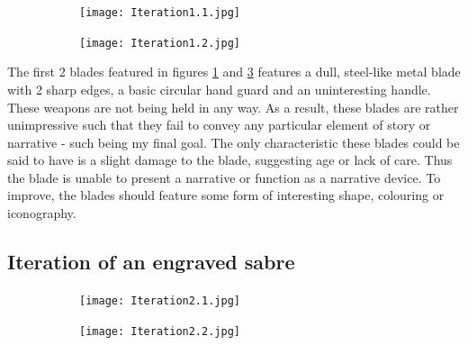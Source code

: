 \documentclass{article}
\begin{document}
\begin{figure}[h]
    \centering
    \caption{}
    \label{fig:Iteration1}
    \begin{subfigure}{0.49\textwidth}
        \texttt{[image: Iteration1.1.jpg]}
        \caption{}
        \label{fig:Iteration1.1}
    \end{subfigure}
    \begin{subfigure}{0.49\textwidth}
        \texttt{[image: Iteration1.2.jpg]}
        \caption{}
        \label{fig:Iteration1.2}
    \end{subfigure}
\end{figure}

The first 2 blades featured in figures \ref{fig:Iteration1.1} and \ref{fig:Iteration1.2} features a dull, steel-like metal blade with 2 sharp edges, a basic circular hand guard and an uninteresting handle. These weapons are not being held in any way. As a result, these blades are rather unimpressive such that they fail to convey any particular element of story or narrative - such being my final goal. The only characteristic these blades could be said to have is a slight damage to the blade, suggesting age or lack of care. Thus the blade is unable to present a narrative or function as a narrative device. To improve, the blades should feature some form of interesting shape, colouring or iconography.

\pagebreak

\subsection{Iteration of an engraved sabre} \label{Iteration2}

\begin{figure}[h]
    \centering
    \caption{}
    \label{fig:Iteration2}
    \begin{subfigure}{0.49\textwidth}
        \texttt{[image: Iteration2.1.jpg]}
        \caption{}
        \label{fig:Iteration2.1}
    \end{subfigure}
    \begin{subfigure}{0.49\textwidth}
        \texttt{[image: Iteration2.2.jpg]}
        \caption{}
        \label{fig:Iteration2.2}
    \end{subfigure}
\end{figure}
\end{document}

